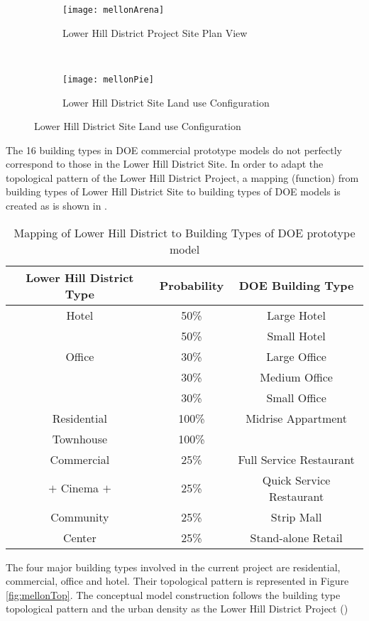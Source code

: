\begin{figure}[h!]
  \centering
  \begin{subfigure}{0.5\textwidth}
  \centering
  \texttt{[image: mellonArena]}
  \caption[Lower Hill District Site Plan]{Lower Hill District Project Site Plan View}
  \label{fig:mellonArena}
\end{subfigure}
~
\begin{subfigure}{0.3\textwidth}
  \centering
  \texttt{[image: mellonPie]}
  \caption[Lower Hill District Site Land Use]{Lower Hill District Site Land use Configuration}
  \label{fig:mellonPie}
\end{subfigure}
\end{figure}
The 16 building types in DOE commercial prototype models do not
perfectly correspond to those in the Lower Hill District Site. In order to
adapt the topological pattern of the Lower Hill District Project, a mapping
(function) from building types of Lower Hill District Site to building types
of DOE models is created as is shown in .
\begin{table}[h!]
  \centering
  \begin{tabular}{c| c| c}
    \hline
    Lower Hill District Type &Probability &DOE Building Type\\
    \hline
    \hline
    Hotel &50\%&Large Hotel\\
    \cline{2-3}
    &50\%&Small Hotel\\
    \hline
    Office &30\%&Large Office\\
    \cline{2-3}
    &30\%&Medium Office\\
    \cline{2-3}
    &30\%&Small Office\\
    \hline
    Residential &100\%&Midrise Appartment\\
    \cline{1-2}
    Townhouse &100\%&\\
    \hline
    Commercial &25\%&Full Service Restaurant\\
    \cline{2-3}
    $+$ Cinema $+$&25\%&Quick Service Restaurant\\
    \cline{2-3}
    Community &25\%&Strip Mall\\
    \cline{2-3}
    Center &25\%&Stand-alone Retail\\
    \hline
  \end{tabular}
  \caption{Mapping of Lower Hill District to Building Types of DOE prototype model}
  \label{tab:typeMap}
\end{table}

The four major building types involved in the current project are
residential, commercial, office and hotel. Their topological pattern
is represented in Figure \ref{fig:mellonTop}. The conceptual model
construction follows the building type topological pattern and the
urban density as the Lower Hill District Project ()

